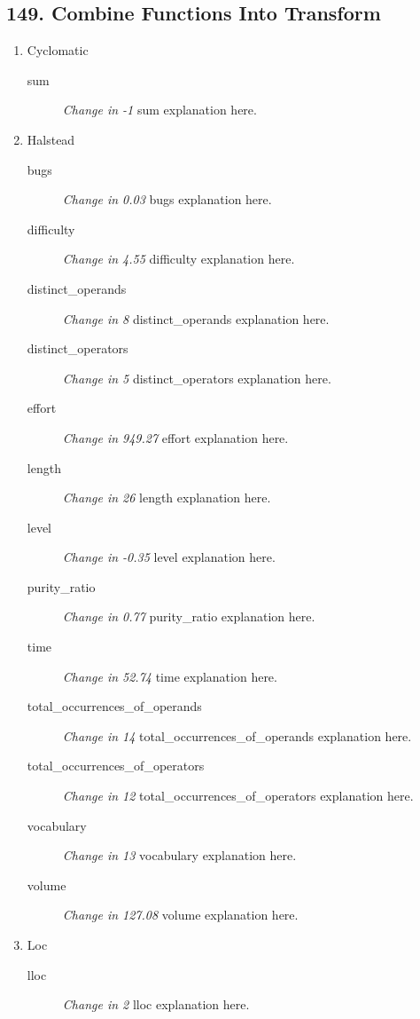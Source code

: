 \subsection{ 149.  Combine Functions Into Transform }

\begin{enumerate}
  \item Cyclomatic
        \begin{description}
          \item [sum] \textit{Change in -1} sum explanation here.
        \end{description}
  \item Halstead
        \begin{description}
          \item [bugs] \textit{Change in 0.03} bugs explanation here.
          \item [difficulty] \textit{Change in 4.55} difficulty explanation here.
          \item [distinct\_operands] \textit{Change in 8} distinct\_operands explanation here.
          \item [distinct\_operators] \textit{Change in 5} distinct\_operators explanation here.
          \item [effort] \textit{Change in 949.27} effort explanation here.
          \item [length] \textit{Change in 26} length explanation here.
          \item [level] \textit{Change in -0.35} level explanation here.
          \item [purity\_ratio] \textit{Change in 0.77} purity\_ratio explanation here.
          \item [time] \textit{Change in 52.74} time explanation here.
          \item [total\_occurrences\_of\_operands] \textit{Change in 14} total\_occurrences\_of\_operands explanation here.
          \item [total\_occurrences\_of\_operators] \textit{Change in 12} total\_occurrences\_of\_operators explanation here.
          \item [vocabulary] \textit{Change in 13} vocabulary explanation here.
          \item [volume] \textit{Change in 127.08} volume explanation here.
        \end{description}
  \item Loc
        \begin{description}
          \item [lloc] \textit{Change in 2} lloc explanation here.

\end{description}
\end{enumerate}
